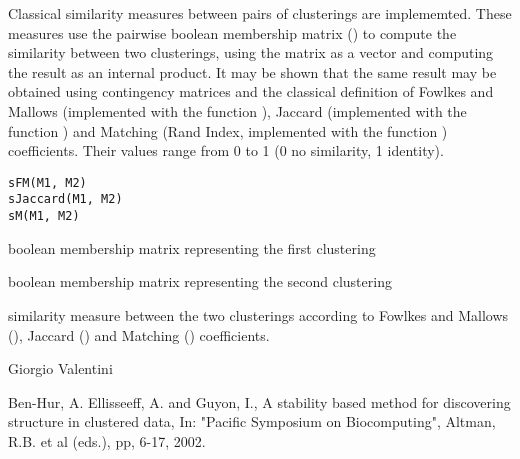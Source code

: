 \documentclass{article}
\begin{document}
\begin{Description}\relax
Classical similarity measures between pairs of clusterings are implememted. These measures use the pairwise boolean membership matrix 
() to compute the similarity between two clusterings, using the matrix as a vector and computing
the result as an internal product. It may be shown that the same result may be obtained using contingency matrices and the classical
definition of Fowlkes and Mallows (implemented with the function ), Jaccard (implemented with the function ) 
and Matching (Rand Index, implemented with the function ) coefficients.
Their values range from 0 to 1 (0 no similarity, 1 identity).
\end{Description}
\begin{Usage}
\begin{verbatim}
sFM(M1, M2)
sJaccard(M1, M2)
sM(M1, M2)
\end{verbatim}
\end{Usage}
\begin{Arguments}
\begin{ldescription}
\item[\code{M1}] boolean membership matrix representing the first clustering 
\item[\code{M2}] boolean membership matrix representing the second clustering 
\end{ldescription}
\end{Arguments}
\begin{Value}
similarity measure between the two clusterings according to Fowlkes and Mallows (), Jaccard () and
Matching () coefficients.
\end{Value}
\begin{Author}\relax
Giorgio Valentini 
\end{Author}
\begin{References}\relax
Ben-Hur, A. Ellisseeff, A. and Guyon, I., A stability based method for discovering structure in clustered data,
In: "Pacific Symposium on Biocomputing", Altman, R.B. et al (eds.), pp, 6-17, 2002.
\end{References}
\begin{SeeAlso}\relax
{}
\end{SeeAlso}
\end{document}
